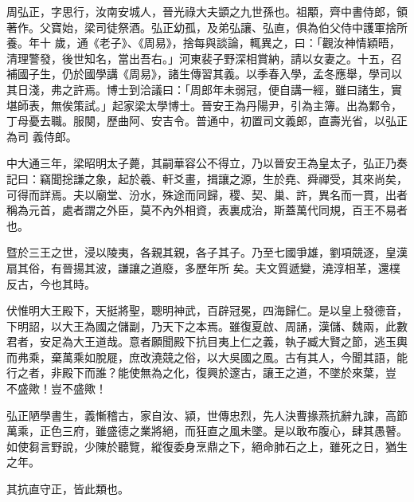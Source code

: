 
\begin{pinyinscope}

 周弘正，字思行，汝南安城人，晉光祿大夫顗之九世孫也。祖顒，齊中書侍郎，領著作。父寶始，梁司徒祭酒。弘正幼孤，及弟弘讓、弘直，俱為伯父侍中護軍捨所養。年十
 歲，通《老子》、《周易》，捨每與談論，輒異之，曰：「觀汝神情穎晤，清理警發，後世知名，當出吾右。」河東裴子野深相賞納，請以女妻之。十五，召補國子生，仍於國學講《周易》，諸生傳習其義。以季春入學，孟冬應舉，學司以其日淺，弗之許焉。博士到洽議曰：「周郎年未弱冠，便自講一經，雖曰諸生，實堪師表，無俟策試。」起家梁太學博士。晉安王為丹陽尹，引為主簿。出為鄴令，丁母憂去職。服闋，歷曲阿、安吉令。普通中，初置司文義郎，直壽光省，以弘正為司
 義侍郎。



 中大通三年，梁昭明太子薨，其嗣華容公不得立，乃以晉安王為皇太子，弘正乃奏記曰：竊聞捴謙之象，起於羲、軒爻畫，揖讓之源，生於堯、舜禪受，其來尚矣，可得而詳焉。夫以廟堂、汾水，殊途而同歸，稷、契、巢、許，異名而一貫，出者稱為元首，處者謂之外臣，莫不內外相資，表裏成治，斯蓋萬代同規，百王不易者也。



 暨於三王之世，浸以陵夷，各親其親，各子其子。乃至七國爭雄，劉項競逐，皇漢扇其俗，有晉揚其波，謙讓之道廢，多歷年所
 矣。夫文質遞變，澆淳相革，還樸反古，今也其時。



 伏惟明大王殿下，天挺將聖，聰明神武，百辟冠冕，四海歸仁。是以皇上發德音，下明詔，以大王為國之儲副，乃天下之本焉。雖復夏啟、周誦，漢儲、魏兩，此數君者，安足為大王道哉。意者願聞殿下抗目夷上仁之義，執子臧大賢之節，逃玉輿而弗乘，棄萬乘如脫屣，庶改澆競之俗，以大吳國之風。古有其人，今聞其語，能行之者，非殿下而誰？能使無為之化，復興於邃古，讓王之道，不墜於來葉，豈
 不盛歟！豈不盛歟！



 弘正陋學書生，義慚稽古，家自汝、潁，世傳忠烈，先人決曹掾燕抗辭九諫，高節萬乘，正色三府，雖盛德之業將絕，而狂直之風未墜。是以敢布腹心，肆其愚瞽。如使芻言野說，少陳於聽覽，縱復委身烹鼎之下，絕命肺石之上，雖死之日，猶生之年。



 其抗直守正，皆此類也。




\end{pinyinscope}

